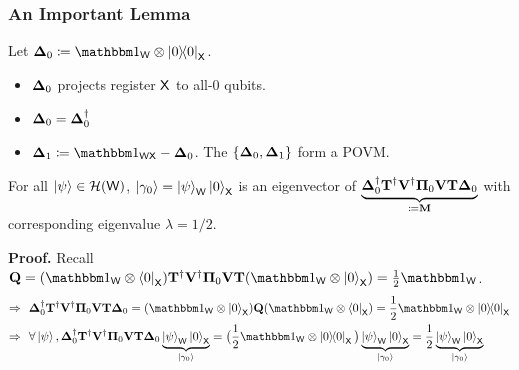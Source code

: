 \documentclass[aspectratio=1610, 12pt, xcolor={dvipsnames}]{beamer}
\begin{document}
\begin{frame}
\frametitle{An Important Lemma}
Let $\vb{\Delta}_0 \coloneqq \idm_\reg{w} \tensor \ketbra{0}_\reg{x}$.
\begin{itemize}
\item 
$\vb{\Delta}_0$ projects register $\reg{x}$ to all-$0$ qubits. 
\item
$\vb{\Delta}_0 = \vb{\Delta}^\dagger_0$ 
\item
$\vb{\Delta}_1 \coloneqq \idm_\reg{wx}  -  \vb{\Delta}_0$. The $\{\vb{\Delta}_0, \vb{\Delta}_1\}$ form a POVM.
\end{itemize}
{\small
\begin{LemmaBox}[label={lem:technical}]{}
 For all $\ket{\psi}\in \mathcal{H}(\reg{w})$, $\ket{\gamma_0} = \ket{\psi}_\reg{w}\ket{0}_\reg{x}$ is an eigenvector of $\underbrace{\vb{\Delta}^\dagger_0 \vb{T}^\dagger \vb{V}^\dagger \vb{\Pi}_0 \vb{V} \vb{T} \vb{\Delta}_0}_{\coloneqq \vb{M}}$ with corresponding eigenvalue $\lambda = 1/2$.
\end{LemmaBox}
}
{\bf Proof.} Recall $\vb{Q}	 = (\idm_\reg{w} \tensor \bra{0}_\reg{x}) \vb{T}^\dagger \vb{V}^\dagger \vb{\Pi}_0 \vb{V} \vb{T} (\idm_\reg{w} \tensor \ket{0}_\reg{x}) = \frac{1}{2}\idm_\reg{w}$.
\begin{align*}
\Rightarrow ~~ & 
\vb{\Delta}^\dagger_0 \vb{T}^\dagger \vb{V}^\dagger \vb{\Pi}_0  \vb{V} \vb{T} \vb{\Delta}_0 = (\idm_\reg{w}\tensor\ket{0}_\reg{x}) \vb{Q} (\idm_\reg{w}\tensor\bra{0}_\reg{x}) = \frac{1}{2} \idm_\reg{w} \tensor \ketbra{0}_\reg{x} \\
\Rightarrow ~~ &  \forall \ket{\psi}, \vb{\Delta}^\dagger_0 \vb{T}^\dagger \vb{V}^\dagger \vb{\Pi}_0  \vb{V} \vb{T} \vb{\Delta}_0 \underbrace{\ket{\psi}_\reg{w} \ket{0}_\reg{x}}_{\ket{\gamma_0}} = \big(\frac{1}{2} \idm_\reg{w} \tensor \ketbra{0}_\reg{x}\big) \underbrace{\ket{\psi}_\reg{w} \ket{0}_\reg{x}}_{\ket{\gamma_0}} = \frac{1}{2}\underbrace{\ket{\psi}_\reg{w} \ket{0}_\reg{x}}_{\ket{\gamma_0}}
\end{align*}
\end{frame}
\end{document}
